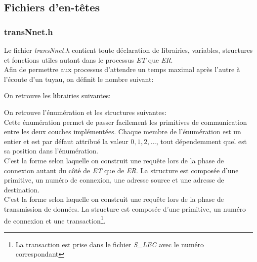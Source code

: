 \documentclass[11pt,french]{article}
\begin{document}
	\subsection{Fichiers d'en-têtes}
	\label{sub:fich-entetes-transport-entity}
		\subsubsection{transNnet.h}
		\label{ssub:transNnet.h}
			Le fichier \emph{transNnet.h} contient toute déclaration de librairies, variables, structures et fonctions utiles
			autant dans le processus \emph{ET} que \emph{ER}.\\

			Afin de permettre aux processus d'attendre un temps maximal après l'autre à l'écoute d'un tuyau,
			on définit le nombre suivant:\\
			

            \vspace{0.5cm}

            On retrouve les librairies suivantes:\\
            

            \vspace{0.5cm}

			On retrouve l'énumération et les structures suivantes:\\
			
            
			Cette énumération permet de passer facilement les primitives de communication entre les deux couches implémentées. Chaque membre de
            l'énumération est un entier et est par défaut attribué la valeur $0,1,2,...$, tout dépendemment quel est sa position dans l'énumération.\\
			
            
            C'est la forme selon laquelle on construit une requête lors de la phase de connexion autant du côté de \emph{ET} que de \emph{ER}. 
            La structure est composée d'une primitive, un numéro de connexion, une adresse source et une adresse de destination.\\

            
            C'est la forme selon laquelle on construit une requête lors de la phase de transmission de données. La structure est composée d'une primitive,
            un numéro de connexion et une transaction\footnote{La transaction est prise dans le fichier \emph{S\_LEC} avec le numéro correspondant}.\\
\end{document}
